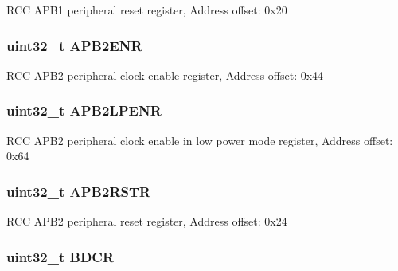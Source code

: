 R\-C\-C A\-P\-B1 peripheral reset register, Address offset\-: 0x20 \hypertarget{struct_r_c_c___type_def_acc7bb47dddd2d94de124f74886d919be}{
\subsubsection[{A\-P\-B2\-E\-N\-R}]{ uint32\-\_\-t A\-P\-B2\-E\-N\-R}}\label{struct_r_c_c___type_def_acc7bb47dddd2d94de124f74886d919be}
R\-C\-C A\-P\-B2 peripheral clock enable register, Address offset\-: 0x44 \hypertarget{struct_r_c_c___type_def_aba51c57f9506e14a6f5983526c78943b}{
\subsubsection[{A\-P\-B2\-L\-P\-E\-N\-R}]{ uint32\-\_\-t A\-P\-B2\-L\-P\-E\-N\-R}}\label{struct_r_c_c___type_def_aba51c57f9506e14a6f5983526c78943b}
R\-C\-C A\-P\-B2 peripheral clock enable in low power mode register, Address offset\-: 0x64 \hypertarget{struct_r_c_c___type_def_ab2c5389c9ff4ac188cd498b8f7170968}{
\subsubsection[{A\-P\-B2\-R\-S\-T\-R}]{ uint32\-\_\-t A\-P\-B2\-R\-S\-T\-R}}\label{struct_r_c_c___type_def_ab2c5389c9ff4ac188cd498b8f7170968}
R\-C\-C A\-P\-B2 peripheral reset register, Address offset\-: 0x24 \hypertarget{struct_r_c_c___type_def_a0b9a3ced775287c8585a6a61af4b40e9}{
\subsubsection[{B\-D\-C\-R}]{ uint32\-\_\-t B\-D\-C\-R}}\label{struct_r_c_c___type_def_a0b9a3ced775287c8585a6a61af4b40e9}
